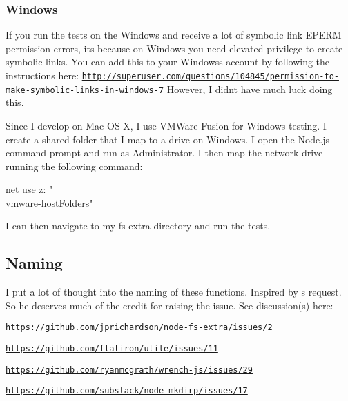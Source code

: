 \subsubsection*{Windows}

If you run the tests on the Windows and receive a lot of symbolic link {\ttfamily E\+P\+E\+RM} permission errors, it\textquotesingle{}s because on Windows you need elevated privilege to create symbolic links. You can add this to your Windows\textquotesingle{}s account by following the instructions here\+: \href{http://superuser.com/questions/104845/permission-to-make-symbolic-links-in-windows-7}{\tt http\+://superuser.\+com/questions/104845/permission-\/to-\/make-\/symbolic-\/links-\/in-\/windows-\/7} However, I didn\textquotesingle{}t have much luck doing this.

Since I develop on Mac OS X, I use V\+M\+Ware Fusion for Windows testing. I create a shared folder that I map to a drive on Windows. I open the {\ttfamily Node.\+js command prompt} and run as {\ttfamily Administrator}. I then map the network drive running the following command\+: \begin{DoxyVerb}net use z: "\\vmware-host\Shared Folders"
\end{DoxyVerb}


I can then navigate to my {\ttfamily fs-\/extra} directory and run the tests.

\subsection*{Naming }

I put a lot of thought into the naming of these functions. Inspired by \textquotesingle{}s request. So he deserves much of the credit for raising the issue. See discussion(s) here\+:


\begin{DoxyItemize}
\item \href{https://github.com/jprichardson/node-fs-extra/issues/2}{\tt https\+://github.\+com/jprichardson/node-\/fs-\/extra/issues/2}
\item \href{https://github.com/flatiron/utile/issues/11}{\tt https\+://github.\+com/flatiron/utile/issues/11}
\item \href{https://github.com/ryanmcgrath/wrench-js/issues/29}{\tt https\+://github.\+com/ryanmcgrath/wrench-\/js/issues/29}
\item \href{https://github.com/substack/node-mkdirp/issues/17}{\tt https\+://github.\+com/substack/node-\/mkdirp/issues/17}
\end{DoxyItemize}

